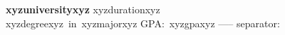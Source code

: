 \textbf{xyzuniversityxyz} \hfill xyzdurationxyz\\
xyzdegreexyz\ in\ xyzmajorxyz \hfill GPA:\ xyzgpaxyz
-----
separator: \vspace{4pt}
